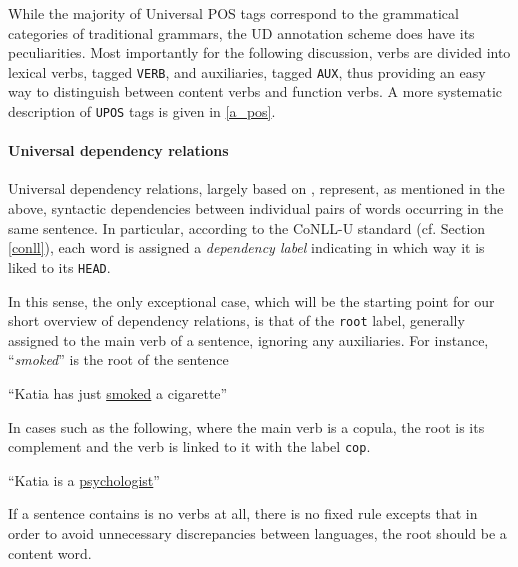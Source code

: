 While the majority of Universal POS tags correspond to the grammatical categories of traditional grammars, the UD annotation scheme does have its peculiarities. Most importantly for the following discussion, verbs are divided into lexical verbs, tagged \texttt{VERB}, and auxiliaries, tagged \texttt{AUX}, thus providing an easy way to distinguish between content verbs and function verbs. A more systematic description of \texttt{UPOS} tags is given in \ref{a_pos}.

\paragraph{Universal dependency relations}
Universal dependency relations, largely based on \cite{st2}, represent, as mentioned in the above, syntactic dependencies between individual pairs of words occurring in the same sentence. In particular, according to the CoNLL-U standard (cf. Section \ref{conll}), each word is assigned a \textit{dependency label} indicating in which way it is liked to its \texttt{HEAD}. \smallskip 

In this sense, the only exceptional case, which will be the starting point for our short overview of dependency relations, is that of the \texttt{root} label, generally assigned to the main verb of a sentence, ignoring any auxiliaries. For instance, ``\textit{smoked}'' is the root of the sentence \smallskip

\begin{example} \label{katia1}
    ``Katia has just \underline{smoked} a cigarette''
\end{example} \smallskip

In cases such as the following, where the main verb is a copula, the root is its complement and the verb is linked to it with the label \texttt{cop}. \smallskip

\begin{example} \label{katia2}
    ``Katia is a \underline{psychologist}''
\end{example} \smallskip

 If a sentence contains is no verbs at all, there is no fixed rule excepts that in order to avoid unnecessary discrepancies between languages, the root should be a content word. \smallskip

